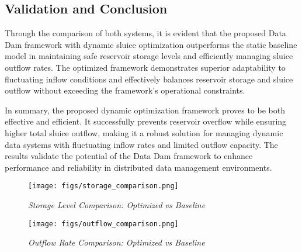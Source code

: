 \subsection{Validation and Conclusion}

Through the comparison of both systems, it is evident that the proposed Data Dam framework with dynamic sluice optimization outperforms the static baseline model in maintaining safe reservoir storage levels and efficiently managing sluice outflow rates. The optimized framework demonstrates superior adaptability to fluctuating inflow conditions and effectively balances reservoir storage and sluice outflow without exceeding the framework's operational constraints.

In summary, the proposed dynamic optimization framework proves to be both effective and efficient. It successfully prevents reservoir overflow while ensuring higher total sluice outflow, making it a robust solution for managing dynamic data systems with fluctuating inflow rates and limited outflow capacity. The results validate the potential of the Data Dam framework to enhance performance and reliability in distributed data management environments.


\begin{figure}[H] %
    \centering
        \texttt{[image: figs/storage\_comparison.png]} %
        \caption{\textit{Storage Level Comparison: Optimized vs Baseline}} %
        \label{fig:storage_comparison}
 
\end{figure}

\begin{figure}[H] %
    \centering
        \texttt{[image: figs/outflow\_comparison.png]} %
        \caption{\textit{Outflow Rate Comparison: Optimized vs Baseline}} %
        \label{fig:outflow_comparison}
 
\end{figure}